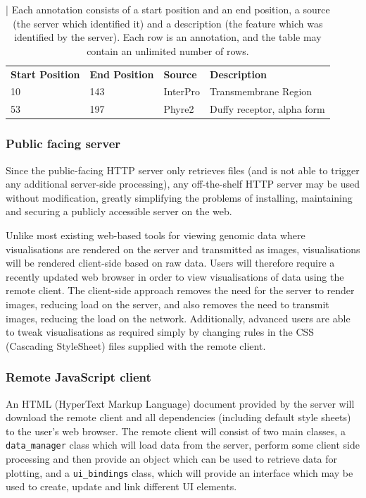 \documentclass[fleqn,10pt]{article} %
\begin{document}
\begin{table}[h]
\begin{tabular}{llll}
\textbf{Start Position} & \textbf{End Position} & \textbf{Source} & \textbf{Description}       \\
10                      & 143                   & InterPro        & Transmembrane Region       \\
53                      & 197                   & Phyre2          & Duffy receptor, alpha form
\end{tabular}
\caption{ | Each annotation consists of a start position and an end position, a source (the server which identified it) and a description (the feature which was identified by the server). Each row is an annotation, and the table may contain an unlimited number of rows.}
\end{table}

\subsubsection{Public facing server}

Since the public-facing HTTP server only retrieves files (and is not able to trigger any additional server-side processing), any off-the-shelf HTTP server may be used without modification, greatly simplifying the problems of installing, maintaining and securing a publicly accessible server on the web.

Unlike most existing web-based tools for viewing genomic data where visualisations are rendered on the server and transmitted as images, visualisations will be rendered client-side based on raw data. Users will therefore require a recently updated web browser in order to view visualisations of data using the remote client. The client-side approach removes the need for the server to render images, reducing load on the server, and also removes the need to transmit images, reducing the load on the network. Additionally, advanced users are able to tweak visualisations as required simply by changing rules in the CSS (Cascading StyleSheet) files supplied with the remote client.

\subsubsection{Remote JavaScript client}

An HTML (HyperText Markup Language) document provided by the server will download the remote client and all dependencies (including default style sheets) to the user's web browser. The remote client will consist of two main classes, a \texttt{data\_manager} class which will load data from the server, perform some client side processing and then provide an object which can be used to retrieve data for plotting, and a \texttt{ui\_bindings} class, which will provide an interface which may be used to create, update and link different UI elements.
\end{document}
